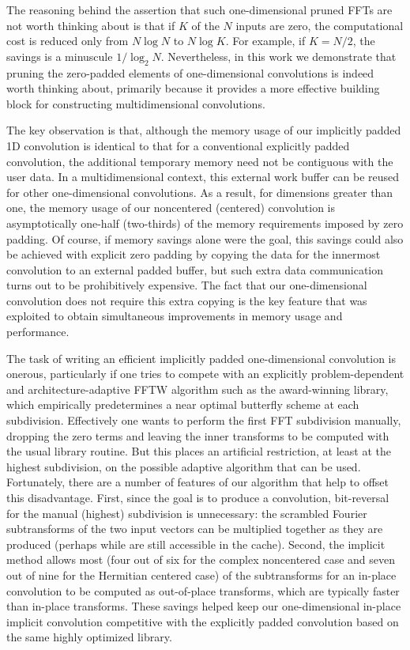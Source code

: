 \documentclass[final]{siamltex}
\begin{document}
The reasoning behind the assertion that such one-dimensional pruned FFTs
are not worth thinking about is that if $K$ of the $N$ inputs are zero,
the computational cost is reduced only from $N\log N$ to $N\log K$.
For example, if $K=N/2$, the savings is a minuscule $1/\log_2 N$.
Nevertheless, in this work we demonstrate that pruning the zero-padded
elements of one-dimensional convolutions is indeed worth thinking about,
primarily because it provides a more effective building block for constructing
multidimensional convolutions.

The key observation is that, although the memory usage of our implicitly
padded 1D convolution is identical to that for a conventional explicitly
padded convolution, the additional temporary memory need not be contiguous
with the user data.  In a multidimensional context, this external work
buffer can be reused for other one-dimensional convolutions.
As a result, for dimensions greater than one, the memory usage of our
noncentered (centered) convolution is asymptotically one-half (two-thirds)
of the memory requirements imposed by zero padding.
Of course, if memory savings alone were the goal, this savings could
also be achieved with explicit zero padding by copying the data for the
innermost convolution to an external padded buffer, but such extra data
communication turns out to be prohibitively expensive. The fact that our
one-dimensional convolution does not require this extra copying is the key
feature that was exploited to obtain simultaneous improvements in memory
usage and performance.

The task of writing an efficient implicitly padded one-dimensional
convolution is onerous, particularly if one tries to compete with an
explicitly problem-dependent and architecture-adaptive FFTW algorithm such
as the award-winning \cite{FFTW} library, which empirically predetermines a
near optimal butterfly scheme at each subdivision. Effectively one wants to
perform the first FFT subdivision manually, dropping the zero terms and
leaving the inner transforms to be computed with the usual library
routine. But this places an artificial restriction, at least at the highest
subdivision, on the possible adaptive algorithm that can be
used. Fortunately, there are a number of features of our algorithm that
help to offset this disadvantage. First, since the goal is to produce a
convolution, bit-reversal for the manual (highest) subdivision is
unnecessary: the scrambled Fourier subtransforms of the two input vectors
can be multiplied together as they are produced (perhaps while are still
accessible in the cache). Second, the implicit method allows most (four out
of six for the complex noncentered case and seven out of nine for the
Hermitian centered case) of the subtransforms for an in-place convolution
to be computed as out-of-place transforms, which are typically faster than
in-place transforms.  These savings helped keep our one-dimensional in-place
implicit convolution competitive with the explicitly padded convolution
based on the same highly optimized library. 
\end{document}
